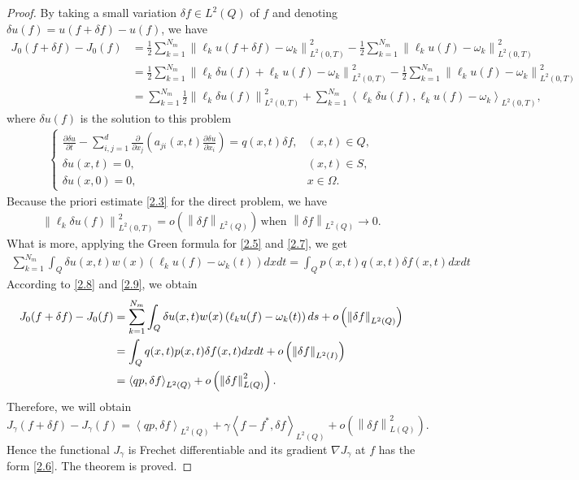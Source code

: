 \documentclass[]{article}
\begin{document}
\begin{proof}
	By taking a small variation $\delta f \in L^2(Q)$ of $f$ and denoting $\delta u(f)=u(f+\delta f)-u(f)$, we have
	\begin{align*}
		J_0(f+\delta f)-J_0(f)&=\frac{1}{2}\sum_{k=1}^{N_m}\left\|\ell_k u(f+\delta f)-\omega_k\right\|^2_{L^2(0, T)}-\frac{1}{2}\sum_{k=1}^{N_m}\left\|\ell_k u(f)-\omega_k\right\|^2_{L^2(0, T)}\\
		&=\frac{1}{2}\sum_{k=1}^{N_m}\left\|\ell_k \delta u(f) +\ell_k u(f)-\omega_k\right\|^2_{L^2(0, T)}-\frac{1}{2}\sum_{k=1}^{N_m}\left\|\ell_k u(f)-\omega_k\right\|^2_{L^2(0, T)}\\
		&=\sum_{k=1}^{N_m}\frac{1}{2}\left\|\ell_k \delta u(f)\right\|^2_{L^2(0, T)}+\sum_{k=1}^{N_m}\left\langle \ell_k \delta u(f), \ell_k u(f)-\omega_k\right\rangle_{L^2(0, T)},
	\end{align*}
	where $\delta u(f)$ is the solution to this problem
	\begin{align}\label{2.7}
		\begin{cases}
			\frac{\partial \delta u}{\partial t}-\sum\limits_{i, j=1}^{d}\frac{\partial}{\partial x_j}\left(a_{ji}(x, t)\frac{\partial \delta u}{\partial x_i}\right)=q(x, t)\delta f,&(x, t)\in Q,\\
			\delta u(x, t)=0, & (x, t)\in S,\\
			\delta u(x, 0)=0, &x\in \Omega.
		\end{cases}
	\end{align}
	Because the priori estimate \eqref{2.3} for the direct problem, we have
	\begin{align}\label{2.8}
		\left\|\ell_k\delta u(f)\right\|_{L^2(0, T)}^2=o\left(\left\|\delta f\right\|_{L^2(Q)}\right)\, \text{when } \left\|\delta f\right\|_{L^2(Q)}\to 0.
	\end{align}
	What is more, applying the Green formula for \eqref{2.5} and \eqref{2.7}, we get
	\begin{align}\label{2.9}
		\sum_{k=1}^{N_m}\int_{Q} \delta u(x, t) w(x) \left(\ell_k u(f)-\omega_k(t)\right)dxdt=\int_{Q} p(x, t)q(x, t)\delta f(x, t)dxdt
	\end{align}
	According to \eqref{2.8} and \eqref{2.9}, we obtain
	\begin{align*}
		J_0(f+\delta f)-J_0(f)&=\sum_{k=1}^{N_m}\int_{Q}\delta u(x, t)w(x)\left(\ell_k u(f)-\omega_k(t)\right)ds+o\left(\left\|\delta f\right\|_{L^2(Q)}\right)\notag\\
		&=\int_Q q(x, t)p(x, t)\delta f(x, t)dxdt+o\left(\left\|\delta f\right\|_{L^2(I)}\right)\notag\\
		&=\left\langle qp,\delta f \right\rangle_{L^2(Q)}+o\left(\left\|\delta f\right\|^2_{L(Q)}\right).
	\end{align*}
	Therefore, we will obtain
	$$J_\gamma(f+\delta f)-J_\gamma(f)=\left\langle qp,\delta f \right\rangle_{L^2(Q)}+\gamma\left\langle f-f^*,\delta f \right\rangle_{L^2(Q)}+o\left(\left\|\delta f\right\|^2_{L(Q)}\right).$$
	Hence the functional $J_\gamma$ is Frechet differentiable and its gradient $\nabla J_\gamma$ at $f$ has the form \eqref{2.6}. The theorem is proved.
\end{proof}
\end{document}

